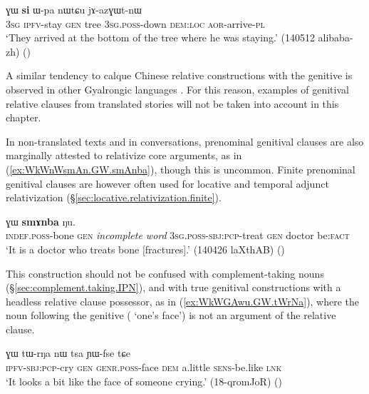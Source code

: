 \begin{exe}
\ex \label{ex:kurAZi.GW.relative}
  ɣɯ \textbf{si} ɯ-pa nɯtɕu jɤ-azɣɯt-nɯ \\
 \textsc{3sg} \textsc{ipfv}-stay \textsc{gen} tree \textsc{3sg}.\textsc{poss}-down \textsc{dem}:\textsc{loc} \textsc{aor}-arrive-\textsc{pl} \\
\glt `They arrived at the bottom of the tree where he was staying.' (140512 alibaba-zh)
()
\end{exe}
 
A similar tendency to calque Chinese relative constructions with the genitive is observed in other Gyalrongic languages \citep{lai18genitivization}.  For this reason, examples of genitival relative clauses from translated stories will not be taken into account in this chapter. 

In non-translated texts and in conversations, prenominal genitival clauses are also marginally attested to relativize core arguments, as in (\ref{ex:WkWnWsmAn.GW.smAnba}), though this is uncommon. Finite prenominal genitival clauses are however often used for locative and temporal adjunct relativization (§\ref{sec:locative.relativization.finite}).

\begin{exe}
\ex \label{ex:WkWnWsmAn.GW.smAnba}
  ɣɯ \textbf{smɤnba} ŋu. \\
 \textsc{indef}.\textsc{poss}-bone \textsc{gen} \textit{incomplete word} \textsc{3sg}.\textsc{poss}-\textsc{sbj}:\textsc{pcp}-treat \textsc{gen} doctor be:\textsc{fact} \\
 \glt `It is a doctor who treats bone [fractures].'  (140426 laXthAB)
 ()
 \end{exe}
  
 This construction should not be confused with complement-taking nouns (§\ref{sec:complement.taking.IPN}), and with true genitival constructions with a headless relative clause possessor, as in (\ref{ex:WkWGAwu.GW.tWrNa}), where the noun following the genitive ( `one's face') is not an argument of the relative clause.
 
\begin{exe}
\ex \label{ex:WkWGAwu.GW.tWrNa}
\gll [ɲɯ-kɯ-ɣɤwu] ɣɯ tɯ-rŋa nɯ tsa ɲɯ-fse tɕe \\
 \textsc{ipfv}-\textsc{sbj}:\textsc{pcp}-cry \textsc{gen} \textsc{genr}.\textsc{poss}-face \textsc{dem} a.little \textsc{sens}-be.like \textsc{lnk} \\
 \glt `It looks a bit like the face of someone crying.' (18-qromJoR)
()
\end{exe}
  
